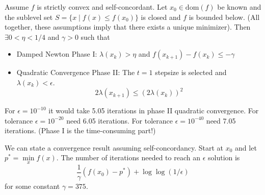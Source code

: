 \documentclass[english, 11pt]{article}
\begin{document}
\begin{thrm}
Assume $f$ is strictly convex and self-concordant. Let $x_0 \in \text{dom}(f)$ be known and the sublevel set $S = \{x \mid f(x) \le f(x_0) \}$ is closed and $f$ is bounded below. (All together, these assumptions imply that there exists a unique minimizer). Then $\exists 0<\eta<1/4$ and $\gamma>0$ such that
\begin{itemize}
\item Damped Newton Phase I: $\lambda(x_k) > \eta$ and $f(x_{k+1}) - f(x_k) \le  -\gamma$
\item Quadratic Convergence Phase II: The $t=1$ stepsize is selected and $\lambda(x_k) < \epsilon$.
\[
2\lambda(x_{k+1}) \le (2 \lambda(x_k))^2
\]
\end{itemize}
\end{thrm}

\begin{exmp}
For $\epsilon=10^{-10}$ it would take 5.05 iterations in phase II quadratic convergence. For tolerance $\epsilon=10^{-20}$ need 6.05 iterations. For tolerance $\epsilon=10^{-40}$ need 7.05 iterations. (Phase I is the time-consuming part!)
\end{exmp}

\begin{thrm}
We can state a convergence result assuming self-concordancy. Start at $x_0$ and let $p^* = \min \limits_x f(x)$. The number of iterations needed to reach an $\epsilon$ solution is
\[
\frac{1}{\gamma} \left( f(x_0) - p^*  \right)
  + \log \log (1/\epsilon)
  \]
for some constant $\gamma=375$.



\end{thrm}
\end{document}
